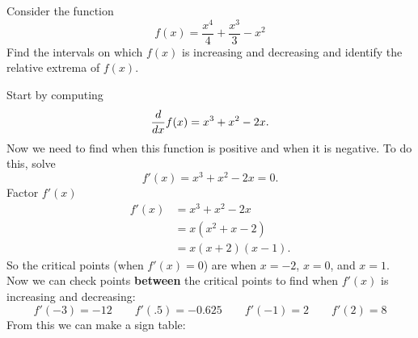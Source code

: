 \hfil
\begin{example}\label{E:relativeextrema}
    Consider the function 
    $$
    f(x) = \frac{x^4}{4}+\frac{x^3}{3}-x^2
    $$
    Find the intervals on which $f(x)$ is increasing and decreasing and
    identify the relative extrema of $f(x)$. \cite{mooc}
    \clearpage
    \begin{solution}
    Start by computing
    \[
    \displaystyle\frac{d}{dx} f(x) = x^3+x^2-2x.
    \]
    Now we need to find when this function is positive and when it is
    negative. To do this, solve 
    \[
    f'(x) = x^3+x^2-2x =0.
    \]
    Factor $f'(x)$
    \begin{align*}
    f'(x) &= x^3+x^2-2x \\
    &=x(x^2+x-2)\\
    &=x(x+2)(x-1).
    \end{align*}
    So the critical points (when $f'(x)=0$) are when $x=-2$, $x=0$, and
    $x=1$. Now we can check points \textbf{between} the critical points to find
    when $f'(x)$ is increasing and decreasing:
    \[
    f'(-3)=-12 \qquad f'(.5)=-0.625 \qquad f'(-1)=2 \qquad f'(2)=8
    \]
    From this we can make a sign table:
    
    \flushleft
\end{solution}
\end{example}
